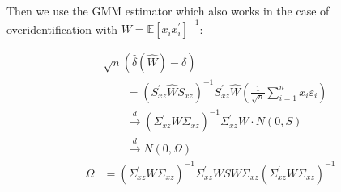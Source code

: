 Then we use the GMM estimator which also works in the case of overidentification with $W = \mathbb{E}\left[x_i x_i^\prime\right]^{-1}$:

\begin{align*}
    &\sqrt{n}(\widehat{\delta}(\widehat{W})-\delta) \\
    &\qquad =\left(S_{x z}^{\prime} \widehat{W} S_{x z}\right)^{-1} S_{x z}^{\prime} \widehat{W}\left(\frac{1}{\sqrt{n}} \sum_{i=1}^n x_i \varepsilon_i\right) \\
    &\qquad \stackrel{d}{\longrightarrow}\left(\Sigma_{x z}^{\prime} W \Sigma_{x z}\right)^{-1} \Sigma_{x z}^{\prime} W \cdot N(0, S) \\
    &\qquad \stackrel{d}{\longrightarrow}N\left(0,\Omega\right) \\
    \Omega & = \left(\Sigma_{x z}^{\prime} W \Sigma_{x z}\right)^{-1} \Sigma_{x z}^{\prime} W S W \Sigma_{x z}\left(\Sigma_{x z}^{\prime} W \Sigma_{x z}\right)^{-1}
\end{align*}